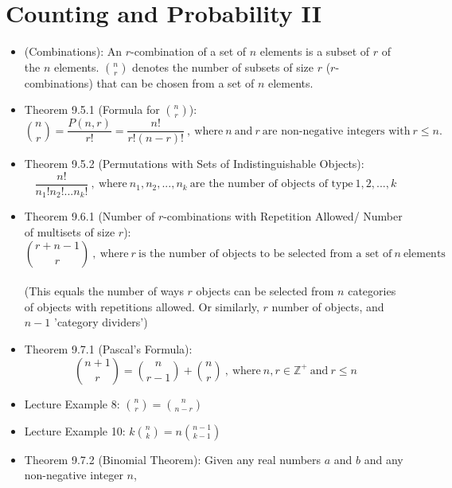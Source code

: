 \documentclass{article}
\begin{document}
\section*{Counting and Probability II}
\begin{itemize}
    \item (Combinations): An $r$-combination of a set of $n$ elements is a subset of $r$ of the $n$ elements. $\binom{n}{r}$ denotes the number of subsets of size $r$ ($r$-combinations) that can be chosen from a set of $n$ elements.
    \item Theorem 9.5.1 (Formula for $\binom{n}{r}$):
        \begin{equation*}
            \binom{n}{r}= \frac{P(n,r)}{r!} = \frac{n!}{r!(n-r)!}\ ,\ \text{where}\ n\ \text{and}\ r\ \text{are non-negative integers with}\ r\leqslant n.
        \end{equation*}
    \item Theorem 9.5.2 (Permutations with Sets of Indistinguishable Objects): 
        \begin{equation*}
            \frac{n!}{n_1!n_2!...n_k!}\ ,\ \text{where}\ n_1, n_2, ..., n_k\ \text{are the number of objects of type}\ 1, 2, ...,k
        \end{equation*}
    \item Theorem 9.6.1 (Number of $r$-combinations with Repetition Allowed/ Number of multisets of size $r$):
        \begin{equation*}
            \binom{r+n-1}{r}\ ,\ \text{where}\ r\ \text{is the number of objects to be selected from a set of}\ n\ \text{elements}
        \end{equation*}
        \\ (This equals the number of ways $r$ objects can be selected from $n$ categories of objects with repetitions allowed. Or similarly, $r$ number of objects, and $n-1$ 'category dividers')
    \item Theorem 9.7.1 (Pascal's Formula):
        \begin{equation*}
            \binom{n+1}{r} = \binom{n}{r-1} + \binom{n}{r}\ ,\ \text{where}\ n,r\in \mathbb{Z}^+\ \text{and}\ r\leqslant n
        \end{equation*}
    \item Lecture Example 8: $\binom{n}{r}=\binom{n}{n-r}$
    \item Lecture Example 10: $k\binom{n}{k}=n\binom{n-1}{k-1}$
    \item Theorem 9.7.2 (Binomial Theorem): Given any real numbers $a$ and $b$ and any non-negative integer $n$,

\end{itemize}
\end{document}
